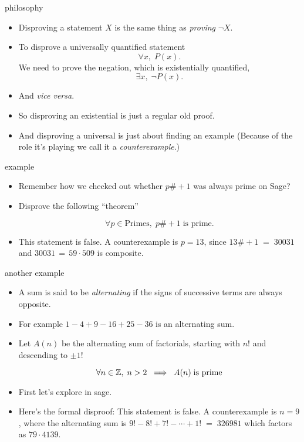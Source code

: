 \documentclass[handout,landscape]{beamer}
\begin{document}
\begin{frame}{philosophy}
\begin{itemize}
\item Disproving a statement $X$ is the same thing as {\em proving} $\lnot X$.\pause
\item To disprove a universally quantified statement \pause 
\[ \forall x, \; P(x). \] \pause
We need to prove the negation, which is existentially quantified, \pause
\[ \exists x, \; \lnot P(x). \] \pause
\item And {\em vice versa}. \pause
\item So disproving an existential is just a regular old proof. \pause
\item And disproving a universal is just about finding an example \pause \newline
(Because of the role it's playing we call it a {\em counterexample}.)
\end{itemize}
\end{frame}

\begin{frame}{example}
\begin{itemize}
\item Remember how we checked out whether $p\# + 1$ was always prime on Sage? \pause
\item Disprove the following ``theorem''
\begin{thm*}
\[ \forall p \in \mbox{Primes}, \; p\# + 1 \; \mbox{is prime.} \]
\end{thm*}
\pause

\item This statement is false.  A counterexample is $p=13$, since $13\# + 1 \; = \; 30031$ and $30031 \, = \, 59\cdot 509$ is composite. 
\end{itemize}
\end{frame}

\begin{frame}{another example}
\begin{itemize}
\item A sum is said to be {\em alternating} if the signs of successive terms are always opposite. \pause
\item For example $1-4+9-16+25-36$ is an alternating sum. \pause
\item Let $A(n)$ be the alternating sum of factorials, starting with $n!$ and descending to $\pm 1!$\pause
\begin{thm*}
\[ \forall n \in {\mathbb Z}, \; n>2 \; \implies \; A(n) \; \mbox{is prime} \]
\end{thm*}
\pause
\item First let's explore in sage. \pause
\item Here's the formal disproof: \pause \newline
This statement is false.  A counterexample is $n=9$, where the alternating sum is $9!-8!+7!- \cdots +1! \; = \; 326981$ which factors as $79\cdot 4139$.
\end{itemize}
\end{frame}
\end{document}

